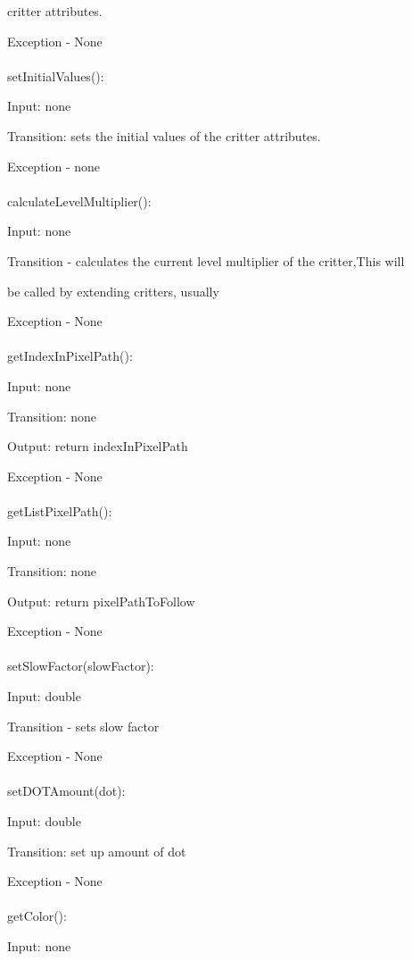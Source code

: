 \documentclass[12,english]{article}
\begin{document}
		    critter attributes.
		
		
		    Exception - None\\
		\\
		setInitialValues():
		
			Input: none
			
			Transition: sets the initial values of the critter attributes.
			 
			Exception - none\\
			\\
		calculateLevelMultiplier():
			
			Input: none
			 
			Transition - calculates the current level multiplier of the critter,This will
			
			be called by extending critters, usually
			  			 
			Exception - None\\ 
			 \\
		getIndexInPixelPath():
		
		    Input: none
		     
		    Transition: none
		    
		    Output: return indexInPixelPath
		     
		    Exception - None\\ 
			 \\
		getListPixelPath():
		
		    Input: none
		     
		    Transition: none
		    
		    Output: return pixelPathToFollow
		     
		    Exception - None\\  
			 \\
        setSlowFactor(slowFactor):
            
            Input: double
		    
		    Transition - sets slow factor
		    
		    Exception - None\\ 
			 \\
		setDOTAmount(dot):
		    
		    Input: double
		    
		    Transition: set up amount of dot
		    
		    Exception - None\\ 
			 \\
		getColor():
		
		    Input: none
		     
\end{document}
